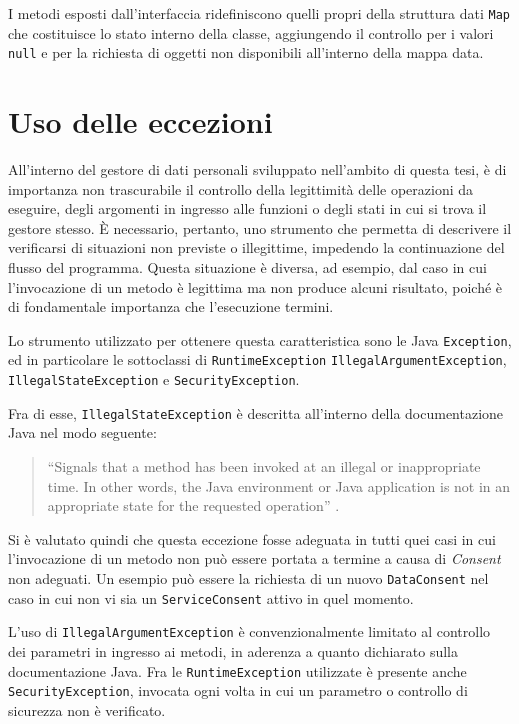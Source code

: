 I metodi esposti dall’interfaccia ridefiniscono quelli propri della struttura dati \texttt{Map} che costituisce lo stato interno della classe, aggiungendo il controllo per i valori \texttt{null} e per la richiesta di oggetti non disponibili all’interno della mappa data.

\section{Uso delle eccezioni}
All’interno del gestore di dati personali sviluppato nell’ambito di questa tesi, \`e di importanza non trascurabile il controllo della legittimit\`a delle operazioni da eseguire, degli argomenti in ingresso alle funzioni o degli stati in cui si trova il gestore stesso. \`E necessario, pertanto, uno strumento che permetta di descrivere il verificarsi di situazioni non previste o illegittime, impedendo la continuazione del flusso del programma. Questa situazione \`e diversa, ad esempio, dal caso in cui l’invocazione di un metodo \`e legittima ma non produce alcuni risultato, poich\'e \`e di fondamentale importanza che l’esecuzione termini.

Lo strumento utilizzato per ottenere questa caratteristica sono le Java \texttt{Exception}, ed in particolare le sottoclassi di \texttt{RuntimeException} \texttt{IllegalArgumentException}, \texttt{IllegalStateException} e \texttt{SecurityException}. 

Fra di esse, \texttt{IllegalStateException} \`e descritta all’interno della documentazione Java nel modo seguente:
\begin{quote}
“Signals that a method has been invoked at an illegal or inappropriate time. In other words, the Java environment or Java application is not in an appropriate state for the requested operation” \cite{java8api}.
\end{quote}
Si \`e valutato quindi che questa eccezione fosse adeguata in tutti quei casi in cui l’invocazione di un metodo non pu\`o essere portata a termine a causa di \textit{Consent} non adeguati. Un esempio pu\`o essere la richiesta di un nuovo \texttt{DataConsent} nel caso in cui non vi sia un \texttt{ServiceConsent} attivo in quel momento.

L’uso di \texttt{IllegalArgumentException} \`e convenzionalmente limitato al controllo dei parametri in ingresso ai metodi, in aderenza a quanto dichiarato sulla documentazione Java. Fra le \texttt{RuntimeException} utilizzate \`e presente anche \texttt{SecurityException}, invocata ogni volta in cui un parametro o controllo di sicurezza non \`e verificato.

